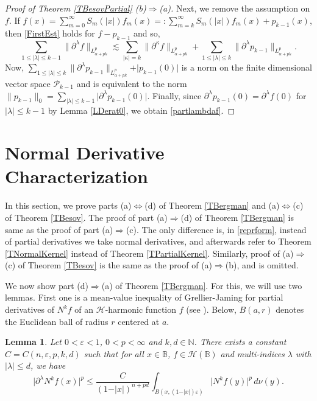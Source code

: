 \documentclass{amsart}
\newtheorem{lemma}[theorem]{Lemma}
\theoremstyle{definition}
\theoremstyle{remark}
\begin{document}
\begin{proof}[Proof of Theorem \ref{TBesovPartial} (b)$\Rightarrow$(a)]
Next, we remove the assumption on $f$.
If $f(x)=\sum_{m=0}^\infty S_m(\vert x\vert)f_m(x)
=:\sum_{m=k}^\infty S_m(\vert x\vert)f_m(x)+p_{k-1}(x)$,
then \eqref{FirstEst} holds for $f-p_{k-1}$ and so,
\begin{equation*}
\sum_{1\le\vert\lambda\vert\le k-1}\|\partial^\lambda f\|_{L^p_{\alpha+pk}}
\lesssim
\sum_{\vert\kappa\vert=k}\|\partial^\kappa f\|_{L^p_{\alpha+pk}}
+\sum_{1\le\vert\lambda\vert\le k}\|\partial^\lambda p_{k-1}\|_{L^p_{\alpha+pk}}.
\end{equation*}
Now,
$\sum_{1\le \vert\lambda\vert\le k}\|\partial^\lambda p_{k-1}\|_{L^p_{\alpha+pk}}
+\vert p_{k-1}(0)\vert$
is a norm on the finite dimensional vector space $\mathcal P_{k-1}$ and is equivalent
to the norm
$\|p_{k-1}\|_0=\sum_{\vert\lambda\vert\le k-1}\vert\partial^\lambda p_{k-1}(0)\vert$.
Finally, since $\partial^\lambda p_{k-1}(0)=\partial^\lambda f(0)$
for $\vert\lambda\vert\le k-1$ by Lemma \ref{LDerat0}, we obtain \eqref{partlambdaf}.
\end{proof}

%
\section{Normal Derivative Characterization}
%

In this section, we prove parts (a)$\Leftrightarrow$(d) of Theorem \ref{TBergman}
and (a)$\Leftrightarrow$(c) of Theorem \ref{TBesov}.
The proof of part (a)$\Rightarrow$(d) of Theorem \ref{TBergman} is same as the
proof of part (a)$\Rightarrow$(c).
The only difference is, in \eqref{reprform}, instead of partial
derivatives we take normal derivatives, and afterwards
refer to Theorem \ref{TNormalKernel} instead of Theorem \ref{TPartialKernel}.
Similarly, proof of (a)$\Rightarrow$(c) of Theorem \ref{TBesov} is the same
as the proof of (a)$\Rightarrow$(b), and is omitted.

We now show part (d)$\Rightarrow$(a) of Theorem \ref{TBergman}.
For this, we will use two lemmas.
First one is a mean-value inequality of Grellier-Jaming
for partial derivatives of $N^k f$ of an $\mathcal H$-harmonic function $f$
(see \cite[Lemma 3.3]{GJ}).
Below, $B(a,r)$ denotes the Euclidean ball of radius $r$ centered at $a$.

\begin{lemma}\label{LGJ}
Let $0<\varepsilon<1$, $0<p<\infty$ and $k,d\in\mathbb N$.
There exists a constant $C=C(n,\varepsilon,p,k,d)$ such that
for all $x\in\mathbb B$, $f\in\mathcal H(\mathbb B)$ and
multi-indices $\lambda$ with $\vert\lambda\vert\le d$,
we have
\begin{equation*}
\vert\partial^\lambda N^k f(x)\vert^p
\le \frac{C}{(1-\vert x\vert)^{n+pd}}
\int_{B(x,(1-\vert x\vert)\varepsilon)} \vert N^k f(y)\vert^p\, d\nu(y).
\end{equation*}
\end{lemma}
\end{document}

